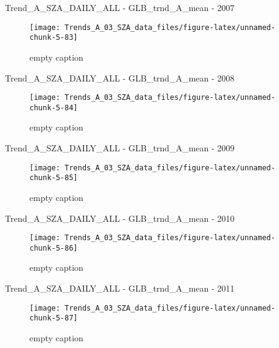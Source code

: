 \documentclass[
  10pt,
  a4paper,oneside]{article}
\begin{document}
Trend\_A\_SZA\_DAILY\_ALL - GLB\_trnd\_A\_mean - 2007

\begin{figure}[!ht]

{\centering \texttt{[image: Trends\_A\_03\_SZA\_data\_files/figure-latex/unnamed-chunk-5-83]} 

}

\caption{ empty caption }\label{fig:unnamed-chunk-5-83}
\end{figure}

Trend\_A\_SZA\_DAILY\_ALL - GLB\_trnd\_A\_mean - 2008

\begin{figure}[!ht]

{\centering \texttt{[image: Trends\_A\_03\_SZA\_data\_files/figure-latex/unnamed-chunk-5-84]} 

}

\caption{ empty caption }\label{fig:unnamed-chunk-5-84}
\end{figure}

Trend\_A\_SZA\_DAILY\_ALL - GLB\_trnd\_A\_mean - 2009

\begin{figure}[!ht]

{\centering \texttt{[image: Trends\_A\_03\_SZA\_data\_files/figure-latex/unnamed-chunk-5-85]} 

}

\caption{ empty caption }\label{fig:unnamed-chunk-5-85}
\end{figure}

Trend\_A\_SZA\_DAILY\_ALL - GLB\_trnd\_A\_mean - 2010

\begin{figure}[!ht]

{\centering \texttt{[image: Trends\_A\_03\_SZA\_data\_files/figure-latex/unnamed-chunk-5-86]} 

}

\caption{ empty caption }\label{fig:unnamed-chunk-5-86}
\end{figure}

Trend\_A\_SZA\_DAILY\_ALL - GLB\_trnd\_A\_mean - 2011

\begin{figure}[!ht]

{\centering \texttt{[image: Trends\_A\_03\_SZA\_data\_files/figure-latex/unnamed-chunk-5-87]} 

}

\caption{ empty caption }\label{fig:unnamed-chunk-5-87}
\end{figure}
\end{document}
